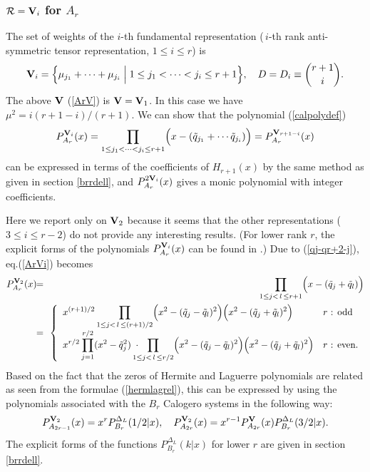 \documentclass[a4paper,12pt]{article}
\begin{document}
\subsubsection{${\cal R}={\bf V}_i$ for $A_r$}

The set of weights of the $i$-th fundamental representation (\,$i$-th rank
anti-symmetric tensor representation, $1\leq i\leq r$) is
\begin{equation}
   {\bf V}_i=\Bigl\{\mu_{j_1}+\cdots+\mu_{j_i}\Bigm|
   1\leq j_1<\cdots<j_i\leq r+1\Bigr\},\quad D=D_i\equiv{r+1\choose i}.
   \label{ArViset}
\end{equation}
The above ${\bf V}$ (\ref{ArV}) is ${\bf V}={\bf V}_1$.
In this case we have $\mu^2=i(r+1-i)/(r+1)$.
We can show that the polynomial (\ref{calpolydef})
\begin{equation}
   P_{A_r}^{{\bf V}_i}(x)=\prod_{1\leq j_1<\cdots<j_i\leq r+1}
   \Bigl(x-(\tilde{q}_{j_1}+\cdots\tilde{q}_{j_i})\Bigr)
   =P_{A_r}^{{\bf V}_{r+1-i}}(x)
   \label{ArVi}
\end{equation}
can be expressed in terms of the coefficients of $H_{r+1}(x)$
by the same method as given in section \ref{brrdell}, and
$P_{A_r}^{2{\bf V}_i}(x)$ gives a monic polynomial with integer coefficients.

Here we report only on ${\bf V}_2$ because it seems that the other 
representations ($3\leq i\leq r-2$) do not provide any interesting results.
(For lower rank $r$, the explicit forms of the polynomials 
$P_{A_r}^{{\bf V}_i}(x)$ can be found in \cite{poly}.)
Due to (\ref{qj-qr+2-j}), eq.(\ref{ArVi}) becomes
\begin{eqnarray}
   P_{A_r}^{{\bf V}_2}(x)&\!\!=\!\!&
   \prod_{1\leq j<\,l\,\leq r+1}
   \Bigl(x-(\tilde{q}_j+\tilde{q}_l)\Bigr)\\
%
   &\!\!=\!\!&
   \left\{\begin{array}{ll}
   {\displaystyle x^{(r+1)/2}\prod_{1\leq j<\,l\,\leq(r+1)/2}
   \Bigl(x^2-(\tilde{q}_j-\tilde{q}_l)^2\Bigr)
   \Bigl(x^2-(\tilde{q}_j+\tilde{q}_l)^2\Bigr)}&\mbox{$r$ : odd}\\
   {\displaystyle x^{r/2}\prod_{j=1}^{r/2}(x^2-\tilde{q}_j^2)
   \;\cdot\!\!\!\!\! \prod_{1\leq j<\,l\,\leq r/2}
   \Bigl(x^2-(\tilde{q}_j-\tilde{q}_l)^2\Bigr)
   \Bigl(x^2-(\tilde{q}_j+\tilde{q}_l)^2\Bigr)}&\mbox{$r$ : even}.
   \end{array}\right.\nonumber
\end{eqnarray}
Based on the fact that the zeros of Hermite and Laguerre
polynomials are related as seen from the formulae (\ref{hermlagrel}),
this can be expressed by using the polynomials associated with the $B_r$
Calogero systems in the following way:
\begin{equation}
   P_{A_{2r-1}}^{{\bf V}_2}(x)=x^rP_{B_r}^{\Delta_L}(1/2|x),\quad
   P_{A_{2r}}^{{\bf V}_2}(x)=
   x^{r-1}P_{A_{2r}}^{{\bf V}}(x)P_{B_r}^{\Delta_L}(3/2|x).
\end{equation}
The explicit forms of the functions $P_{B_r}^{\Delta_L}(k|x)$ for lower
$r$ are given in section \ref{brrdell}.
\end{document}
